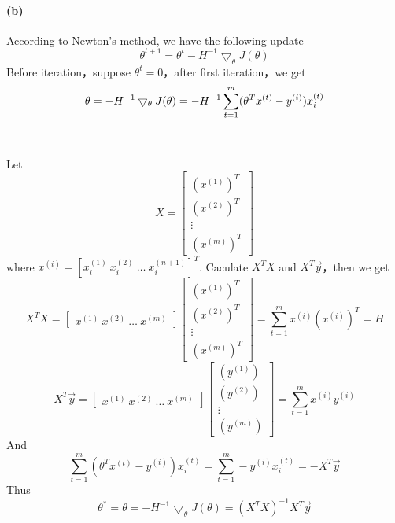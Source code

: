 \documentclass[UTF8]{article}
\begin{document}
\paragraph{(b)}
According to Newton's method, we have the following update \\
\begin{equation}
 \theta^{t+1} = \theta^t - H^{-1}\bigtriangledown_\theta J(\theta) \tag{$2.2$}
\end{equation}
 Before iteration，suppose $\theta^t=0$，after first iteration，we get
$$
   \theta = -H^{-1}\bigtriangledown_\theta J(\theta) \\
   = -H^{-1}\sum_{t=1}^m (\theta^Tx^{(t)}-y^{(i)})x_i^{(t)}
$$ \\
\\
\large Let
\begin{equation}
  X =
\left[
\begin{array}{c}
 (x^{(1)})^T  \\
 (x^{(2)})^T  \\
 \vdots \\
 (x^{(m)})^T
\end{array}
\right]  \tag{$2.3$}
\end{equation}
where $x^{(i)}=[x_i^{(1)} \  x_i^{(2)} \ \dots \ x_i^{(n+1)} ]^T$.
Caculate $X^TX$ and $X^T \vec{y}$，then we get \\
\begin{equation}
  X^TX =
  \left[
  \begin{array}{cccc}
   x^{(1)} \ x^{(2)} \ \dots \ x^{(m)}
  \end{array}
  \right]
  \left[
  \begin{array}{c}
   (x^{(1)})^T  \\
   (x^{(2)})^T  \\
   \vdots \\
   (x^{(m)})^T
  \end{array}
  \right]
  = \sum_{t=1}^m x^{(i)}(x^{(i)})^T
  = H
\tag{$2.4$}
\end{equation}
\begin{equation}
  X^T \vec{y} =
  \left[
  \begin{array}{cccc}
   x^{(1)} \ x^{(2)} \ \dots \ x^{(m)}
  \end{array}
  \right]
    \left[
    \begin{array}{c}
     (y^{(1)}) \\
     (y^{(2)})  \\
     \vdots \\
     (y^{(m)})
    \end{array}
      \right]
      = \sum_{t=1}^mx^{(i)}y^{(i)}
    \tag{$2.5$}
\end{equation}
And
\begin{equation}
  \sum_{t=1}^m (\theta^Tx^{(t)}-y^{(i)})x_i^{(t)} =
  \sum_{t=1}^m -y^{(i)}x_i^{(t)} = -X^T \vec{y}
  \tag{$2.6$}
\end{equation}
Thus
$$
\theta^* = \theta = - H^{-1}\bigtriangledown_\theta J(\theta) =
(X^TX)^{-1}X^T \vec{y}
$$
\end{document}
